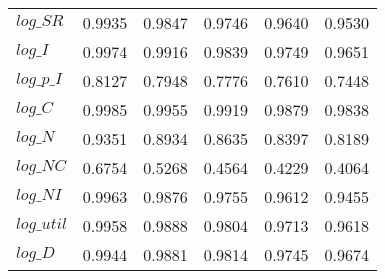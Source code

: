 \begin{center}
\begin{longtable}{lccccc}
$log\_SR    $	 & 	     0.9935	 & 	     0.9847	 & 	     0.9746	 & 	     0.9640	 & 	     0.9530 \\ 
$log\_I     $	 & 	     0.9974	 & 	     0.9916	 & 	     0.9839	 & 	     0.9749	 & 	     0.9651 \\ 
$log\_p\_I  $	 & 	     0.8127	 & 	     0.7948	 & 	     0.7776	 & 	     0.7610	 & 	     0.7448 \\ 
$log\_C     $	 & 	     0.9985	 & 	     0.9955	 & 	     0.9919	 & 	     0.9879	 & 	     0.9838 \\ 
$log\_N     $	 & 	     0.9351	 & 	     0.8934	 & 	     0.8635	 & 	     0.8397	 & 	     0.8189 \\ 
$log\_NC    $	 & 	     0.6754	 & 	     0.5268	 & 	     0.4564	 & 	     0.4229	 & 	     0.4064 \\ 
$log\_NI    $	 & 	     0.9963	 & 	     0.9876	 & 	     0.9755	 & 	     0.9612	 & 	     0.9455 \\ 
$log\_util  $	 & 	     0.9958	 & 	     0.9888	 & 	     0.9804	 & 	     0.9713	 & 	     0.9618 \\ 
$log\_D     $	 & 	     0.9944	 & 	     0.9881	 & 	     0.9814	 & 	     0.9745	 & 	     0.9674 \\ 
\end{longtable}
 \end{center}
